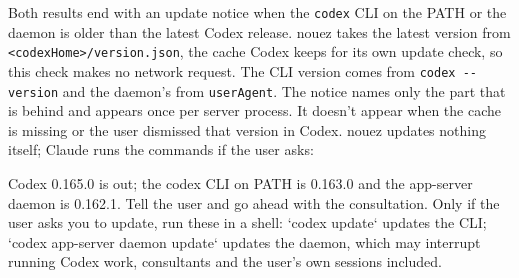 \documentclass[10pt,a4paper]{article}
\newcommand{\code}[1]{\texttt{#1}}
\begin{document}
Both results end with an update notice when the \code{codex} CLI on the PATH or the daemon is
older than the latest Codex release. nouez takes the latest version from
\code{<codexHome>/version.json}, the cache Codex keeps for its own update check, so this check
makes no network request. The CLI version comes from \code{codex -{}-version} and the daemon's from
\code{userAgent}. The notice names only the part that is behind and appears once per server
process. It doesn't appear when the cache is missing or the user dismissed that version in
Codex. nouez updates nothing itself; Claude runs the commands if the user asks:
\begin{plain}
Codex 0.165.0 is out; the codex CLI on PATH is 0.163.0 and the app-server daemon is 0.162.1. Tell the user and go ahead with the consultation. Only if the user asks you to update, run these in a shell: `codex update` updates the CLI; `codex app-server daemon update` updates the daemon, which may interrupt running Codex work, consultants and the user's own sessions included.
\end{plain}
\end{document}
